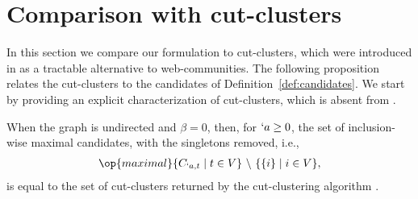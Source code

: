
\section{Comparison with cut-clusters}
\label{sec:comparison-cut}

In this section we compare our formulation to cut-clusters, which were introduced in
\cite{flake:cut-clustering} as a tractable alternative to web-communities.
%
The following proposition relates the cut-clusters to the candidates of Definition~\ref{def:candidates}.
We start by providing an explicit characterization of cut-clusters, which is absent from 
\cite{flake:cut-clustering}.
\begin{proposition}
  \label{prop:cut-clusters-from-candidates}
  When the graph is undirected and $\beta = 0$, then, for $`a \geq 0$,
  the set of inclusion-wise maximal candidates, with the singletons removed, i.e., 
  \begin{align}
	  \op{maximal} \{C_{`a, t} \mid  t\in V\} \ \backslash \ \{\Set{i} \mid i\in V\},\label{eq:cut-clusters}
  \end{align}
  is equal to the set of cut-clusters returned by the cut-clustering algorithm
  \cite[Fig.~2]{flake:cut-clustering}.
\end{proposition}


